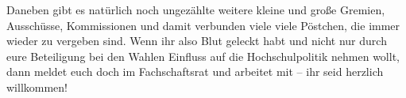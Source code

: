 		Daneben gibt es natürlich noch ungezählte weitere kleine und große Gremien, Ausschüsse, Kommissionen und damit verbunden viele viele Pöstchen, die immer wieder zu vergeben sind. Wenn ihr also Blut geleckt habt und nicht nur durch eure Beteiligung bei den Wahlen Einfluss auf die Hochschulpolitik nehmen wollt, dann meldet euch doch im Fachschaftsrat und arbeitet mit -- ihr seid herzlich willkommen!
